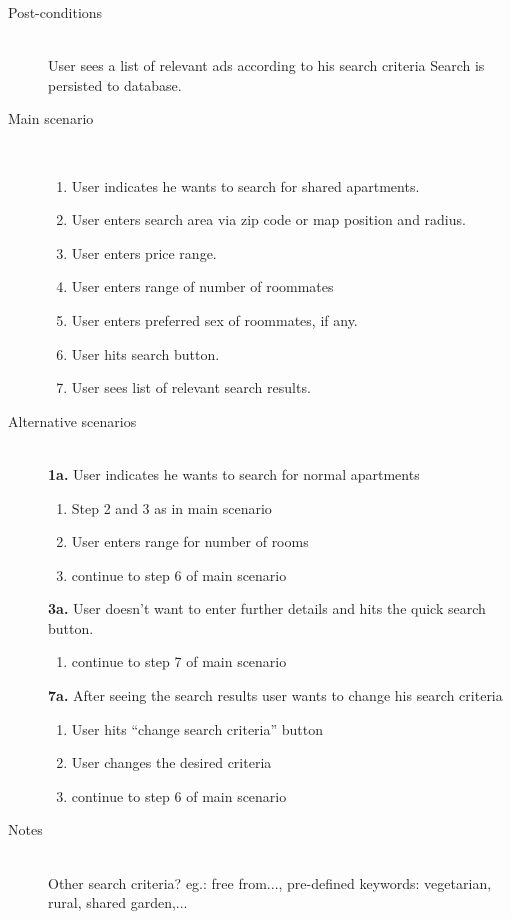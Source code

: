 \documentclass[a4wide]{article}
\begin{document}
\begin{description}
\item[Post-conditions]\mbox{}\\
User sees a list of relevant ads according to his search criteria
Search is persisted to database.
\item[Main scenario]\mbox{}\\
\begin{enumerate}
\item User indicates he wants to search for shared apartments.
\item User enters search area via zip code or map position and radius.
\item User enters price range.
\item User enters range of number of roommates
\item User enters preferred sex of roommates, if any.
\item User hits search button.
\item User sees list of relevant search results.
\end{enumerate}
\item[Alternative scenarios]\mbox{}\\
\textbf{1a.} User indicates he wants to search for normal apartments
\begin{enumerate}
\item Step 2 and 3 as in main scenario
\item User enters range for number of rooms
\item continue to step 6 of main scenario
\end{enumerate}
\textbf{3a.} User doesn't want to enter further details and hits the quick search button.
\begin{enumerate}
\item continue to step 7 of main scenario
\end{enumerate}
\textbf{7a.} After seeing the search results user wants to change his search criteria
\begin{enumerate}
\item User hits “change search criteria” button
\item User changes the desired criteria
\item continue to step 6 of main scenario
\end{enumerate}
\item[Notes]\mbox{}\\
Other search criteria? eg.: free from..., pre-defined keywords: vegetarian, rural, shared garden,...
\end{description}
\end{document}
